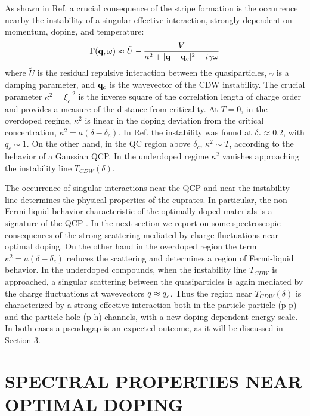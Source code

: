 \documentclass[twoside]{article}
\begin{document}
As shown in Ref. \cite{prl95,jpcs98} a crucial consequence of the stripe 
formation 
is the occurrence nearby the  instability of a singular effective interaction,
strongly dependent on momentum, doping, and temperature:
\begin{equation}
\Gamma ({\bf q},\omega) \approx 
\tilde{U} - \frac{V}{\kappa^{2}+
\vert {\bf q} - {\bf q}_c \vert^2
- i\gamma \omega} 
\label{fitgamlr}
\end{equation}
where $\tilde{U}$ is the residual repulsive interaction between the 
quasiparticles, $\gamma$ is a damping parameter, and ${\bf q}_c$ is the 
wavevector of the CDW instability. The crucial parameter 
$\kappa^2=\xi_c^{-2}$ is 
the inverse square of the correlation length of charge
order and provides a measure of the distance from criticality. 
At $T=0$, in the overdoped regime, $\kappa^2$ is linear in the 
doping deviation from the critical concentration, $\kappa^2=a(\delta-
\delta_c)$. In Ref.  \cite{prl95} the instability was found at 
$\delta_c\approx 0.2$, with $q_c \sim 1$. On the other hand, in the QC region 
above $\delta_c$, $\kappa^2\sim T$, according to the behavior of a Gaussian
QCP. In the underdoped regime $\kappa^2$ vanishes approaching the
instability line $T_{CDW}(\delta)$. 

The occurrence of singular interactions near the QCP and near the 
instability line determines the physical properties of the 
cuprates. In particular, the non-Fermi-liquid behavior characteristic of the 
optimally doped materials is a signature of the QCP \cite{prl95}. In the next 
section we report on some spectroscopic
consequences of the strong scattering mediated by charge fluctuations near 
optimal doping. On the other hand in the overdoped region the term 
$\kappa^2=a(\delta-\delta_c)$ reduces the scattering and determines a region 
of Fermi-liquid behavior. In the underdoped compounds, when the instability 
line $T_{CDW}$ is approached, a singular scattering between the quasiparticles 
is again mediated by the charge fluctuations at wavevectors
${\mbox{\bf $q$}} \approx {\mbox{\bf $q$}}_c$. Thus the region near 
$T_{CDW}(\delta)$ is characterized by a strong effective interaction both in 
the particle-particle (p-p) and the particle-hole (p-h) channels, with a new 
doping-dependent energy scale. In both cases a pseudogap is an expected 
outcome, as it will be discussed in Section 3.

\section{SPECTRAL PROPERTIES NEAR OPTIMAL DOPING}
\end{document}
